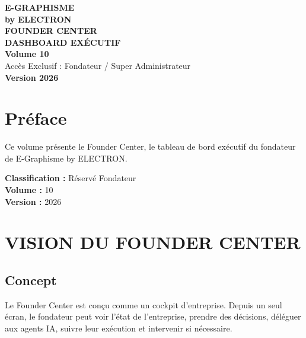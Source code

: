 \documentclass[12pt,a4paper,oneside]{book}
\begin{document}
\begin{titlepage}
\thispagestyle{empty}
\begin{center}
\vspace*{2cm}
{\Huge\bfseries\color{bleuIA}E-GRAPHISME}\\[0.3cm]
{\LARGE\bfseries\color{violet}by ELECTRON}\\[2cm]
\vspace{2cm}
{\huge\bfseries\color{noir}FOUNDER CENTER}\\[0.3cm]
{\huge\bfseries\color{noir}DASHBOARD EXÉCUTIF}\\[1cm]
{\Large\bfseries\color{cyan}Volume 10}\\[3cm}
\vspace{2cm}
{\Large\color{gris}Le Centre de Commandement Intelligent de l'Entreprise}\\[0.5cm]
{\Large\color{gris}Accès Exclusif : Fondateur / Super Administrateur}\\[3cm]
{\Large\bfseries\color{or}Version 2026}\\[2cm]
\vfill
\end{center}
\end{titlepage}

\frontmatter

\chapter*{Préface}
Ce volume présente le Founder Center, le tableau de bord exécutif du fondateur de E-Graphisme by ELECTRON.

\bigskip
\textbf{Classification :} Réservé Fondateur\\
\textbf{Volume :} 10\\
\textbf{Version :} 2026

\tableofcontents

\mainmatter

\chapter{VISION DU FOUNDER CENTER}

\section{Concept}
Le Founder Center est conçu comme un cockpit d'entreprise. Depuis un seul écran, le fondateur peut voir l'état de l'entreprise, prendre des décisions, déléguer aux agents IA, suivre leur exécution et intervenir si nécessaire.
\end{document}
